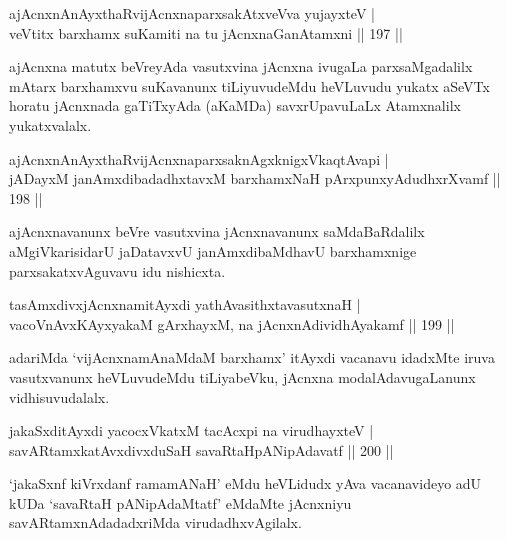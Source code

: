 
\begin{shl}
ajAcnxnAnAyxthaRvijAcnxnaparxsakAtxveVva yujayxteV |\\
veVtitx barxhamx suKamiti na tu jAcnxnaGanAtamxni \hfill || 197 ||
\end{shl}

\begin{artha}
ajAcnxna matutx beVreyAda vasutxvina jAcnxna ivugaLa parxsaMgadalilx mAtarx barxhamxvu suKavanunx tiLiyuvudeMdu heVLuvudu yukatx aSeVTx horatu jAcnxnada gaTiTxyAda (aKaMDa) savxrUpavuLaLx Atamxnalilx yukatxvalalx.
\end{artha}


\begin{shl}
ajAcnxnAnAyxthaRvijAcnxnaparxsaknAgxknigxVkaqtAvapi |\\
jADayxM janAmxdibadadhxtavxM barxhamxNaH pArxpunxyAdudhxrXvamf \hfill || 198 ||
\end{shl}

\begin{artha}
ajAcnxnavanunx beVre vasutxvina jAcnxnavanunx saMdaBaRdalilx aMgiVkarisidarU jaDatavxvU janAmxdibaMdhavU barxhamxnige parxsakatxvAguvavu idu nishicxta.
\end{artha}

\begin{shl}
tasAmxdivxjAcnxnamitAyxdi yathAvasithxtavasutxnaH |\\
vacoV\s nAvxKAyxyakaM gArxhayxM, na jAcnxnAdividhAyakamf \hfill || 199 ||
\end{shl}

\begin{artha}
adariMda `vijAcnxnamAnaMdaM barxhamx' itAyxdi vacanavu idadxMte iruva vasutxvanunx heVLuvudeMdu tiLiyabeVku, jAcnxna modalAdavugaLanunx vidhisuvudalalx.
\end{artha}

\begin{shl}
jakaSxditAyxdi yacocxVkatxM tacAcxpi na virudhayxteV |\\
savARtamxkatAvxdivxduSaH savaRtaHpANipAdavatf \hfill || 200 || 
\end{shl}

\begin{artha}
`jakaSxnf kiVrxdanf ramamANaH' eMdu heVLidudx yAva vacanavideyo adU kUDa `savaRtaH pANipAdaMtatf' eMdaMte jAcnxniyu savARtamxnAdadadxriMda virudadhxvAgilalx. 
\end{artha}

